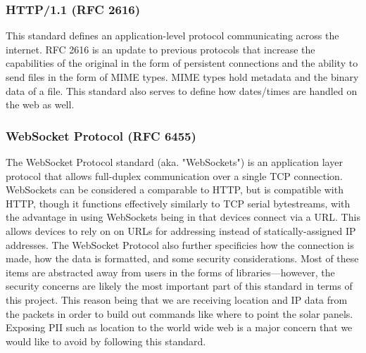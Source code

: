 \subsubsection{HTTP/1.1 (RFC 2616)}
This standard defines an application-level protocol communicating across the internet. RFC 2616 is an update to previous protocols that increase the capabilities of the original in the form of persistent connections and the ability to send files in the form of MIME types. MIME types hold metadata and the binary data of a file. This standard also serves to define how dates/times are handled on the web as well.

\subsubsection{WebSocket Protocol (RFC 6455)} \label{websocket_protocol}
The WebSocket Protocol standard (aka. "WebSockets") is an application layer protocol that allows full-duplex communication over a single TCP connection. WebSockets can be considered a comparable to HTTP, but is compatible with HTTP, though it functions effectively similarly to TCP serial bytestreams, with the advantage in using WebSockets being in that devices connect via a URL. This allows devices to rely on on URLs for addressing instead of statically-assigned IP addresses. The WebSocket Protocol also further specificies how the connection is made, how the data is formatted, and some security considerations. Most of these items are abstracted away from users in the forms of libraries---however, the security concerns are likely the most important part of this standard in terms of this project. This reason being that we are receiving location and IP data from the packets in order to build out commands like where to point the solar panels. Exposing PII such as location to the world wide web is a major concern that we would like to avoid by following this standard.